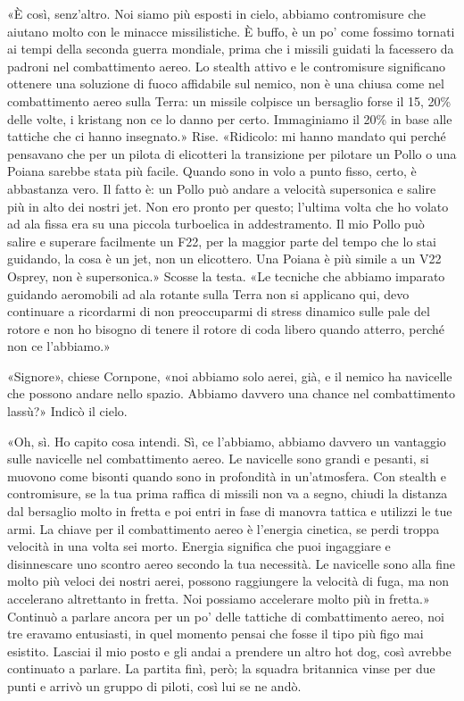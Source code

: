 «È così, senz'altro. Noi siamo più esposti in cielo, abbiamo
contromisure che aiutano molto con le minacce missilistiche. È buffo, è
un po' come fossimo tornati ai tempi della seconda guerra mondiale,
prima che i missili guidati la facessero da padroni nel combattimento
aereo. Lo stealth attivo e le contromisure significano ottenere una
soluzione di fuoco affidabile sul nemico, non è una chiusa come nel
combattimento aereo sulla Terra: un missile colpisce un bersaglio forse
il 15, 20\% delle volte, i kristang non ce lo danno per certo.
Immaginiamo il 20\% in base alle tattiche che ci hanno insegnato.» Rise.
«Ridicolo: mi hanno mandato qui perché pensavano che per un pilota di
elicotteri la transizione per pilotare un Pollo o una Poiana sarebbe
stata più facile. Quando sono in volo a punto fisso, certo, è abbastanza
vero. Il fatto è: un Pollo può andare a velocità supersonica e salire
più in alto dei nostri jet. Non ero pronto per questo; l'ultima volta
che ho volato ad ala fissa era su una piccola turboelica in
addestramento. Il mio Pollo può salire e superare facilmente un F22, per
la maggior parte del tempo che lo stai guidando, la cosa è un jet, non
un elicottero. Una Poiana è più simile a un V22 Osprey, non è
supersonica.» Scosse la testa. «Le tecniche che abbiamo imparato
guidando aeromobili ad ala rotante sulla Terra non si applicano qui,
devo continuare a ricordarmi di non preoccuparmi di stress dinamico
sulle pale del rotore e non ho bisogno di tenere il rotore di coda
libero quando atterro, perché non ce l'abbiamo.»

«Signore», chiese Cornpone, «noi abbiamo solo aerei, già, e il nemico ha
navicelle che possono andare nello spazio. Abbiamo davvero una chance
nel combattimento lassù?» Indicò il cielo.

«Oh, sì. Ho capito cosa intendi. Sì, ce l'abbiamo, abbiamo davvero un
vantaggio sulle navicelle nel combattimento aereo. Le navicelle sono
grandi e pesanti, si muovono come bisonti quando sono in profondità in
un'atmosfera. Con stealth e contromisure, se la tua prima raffica di
missili non va a segno, chiudi la distanza dal bersaglio molto in fretta
e poi entri in fase di manovra tattica e utilizzi le tue armi. La chiave
per il combattimento aereo è l'energia cinetica, se perdi troppa
velocità in una volta sei morto. Energia significa che puoi ingaggiare e
disinnescare uno scontro aereo secondo la tua necessità. Le navicelle
sono alla fine molto più veloci dei nostri aerei, possono raggiungere la
velocità di fuga, ma non accelerano altrettanto in fretta. Noi possiamo
accelerare molto più in fretta.» Continuò a parlare ancora per un po'
delle tattiche di combattimento aereo, noi tre eravamo entusiasti, in
quel momento pensai che fosse il tipo più figo mai esistito. Lasciai il
mio posto e gli andai a prendere un altro hot dog, così avrebbe
continuato a parlare. La partita finì, però; la squadra britannica vinse
per due punti e arrivò un gruppo di piloti, così lui se ne andò.

